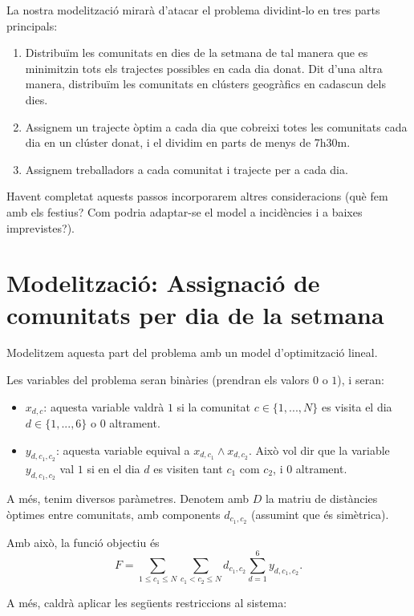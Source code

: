 \documentclass[12pt]{article}
\begin{document}
La nostra modelització mirarà d'atacar el problema dividint-lo en tres parts principals:

\begin{enumerate}
	\item Distribuïm les comunitats en dies de la setmana de tal manera que es minimitzin tots els trajectes possibles en cada dia donat.
		Dit d'una altra manera, distribuïm les comunitats en clústers geogràfics en cadascun dels dies.
	\item Assignem un trajecte òptim a cada dia que cobreixi totes les comunitats cada dia en un clúster donat, i el dividim en parts de menys de 7h30m.
	\item Assignem treballadors a cada comunitat i trajecte per a cada dia.
\end{enumerate}

Havent completat aquests passos incorporarem altres consideracions (què fem amb els festius? Com podria adaptar-se el model a incidències i a baixes imprevistes?).

\section{Modelització: Assignació de comunitats per dia de la setmana}
\label{sec:dia_setmana}

Modelitzem aquesta part del problema amb un model d'optimització lineal.

Les variables del problema seran binàries (prendran els valors $0$ o $1$), i seran:

\begin{itemize}
	\item $x_{d,c}$: aquesta variable valdrà $1$ si la comunitat $c \in \{1,...,N\}$ es visita el dia $d \in \{1,...,6\}$ o $0$ altrament.
	\item $y_{d,c_1,c_2}$: aquesta variable equival a $x_{d,c_1} \wedge x_{d,c_2}$.
		Això vol dir que la variable $y_{d,c_1,c_2}$ val $1$ si en el dia $d$ es visiten tant $c_1$ com $c_2$, i $0$ altrament.
\end{itemize}

A més, tenim diversos paràmetres.
Denotem amb $D$ la matriu de distàncies òptimes entre comunitats, amb components $d_{c_1,c_2}$ (assumint que és simètrica).

Amb això, la funció objectiu és
\[F = \sum_{1 \leq c_1 \leq N} \sum_{c_1 < c_2 \leq N} d_{c_1,c_2} \sum_{d = 1}^6 y_{d,c_1,c_2} .\]

A més, caldrà aplicar les següents restriccions al sistema:
\end{document}
